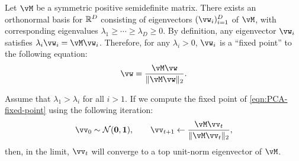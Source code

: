 \documentclass[../../book-main.tex]{subfiles}
\begin{document}
Let \(\vM\) be a symmetric positive semidefinite matrix. There exists an orthonormal basis for \(\mathbb{R}^{D}\) consisting of eigenvectors \((\vw_{i})_{i = 1}^{D}\) of \(\vM\), with corresponding eigenvalues \(\lambda_{1} \geq \cdots \geq \lambda_{D} \geq 0\). By definition, any eigenvector $\vw_i$ satisfies $\lambda_i \vw_i = \vM \vw_i$. Therefore, for any $\lambda_i > 0$, $\vw_i$ is a   ``fixed point'' to the following equation:
\begin{equation}
    \vw = \frac{\vM\vw}{\norm{\vM\vw}_{2}}.
    \label{eqn:PCA-fixed-point}
\end{equation}

\begin{theorem}
Assume that \(\lambda_{1} > \lambda_{i}\) for all \(i > 1\). If we compute the fixed point of  \eqref{eqn:PCA-fixed-point} using the following iteration:
\begin{equation}\label{eq:power_iteration}
    \vv_{0} \sim \dNorm(\vzero, \vone), \qquad \vv_{t + 1} \gets \frac{\vM\vv_{t}}{\norm{\vM\vv_{t}}_{2}},
\end{equation}
then, in the limit, \(\vv_{t}\) will converge to a top unit-norm eigenvector of \(\vM\).
\end{theorem}
\end{document}
